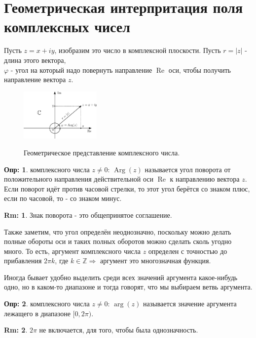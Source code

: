\documentclass[12pt]{article}
\newcommand{\RN}[1]{%
	\textup{\uppercase\expandafter{\romannumeral#1}}%
}
\newcommand{\MZ}{\mathbb{Z}}
\theoremstyle{definition}
\newtheorem{defn}{Опр:}
\newtheorem{rem}{Rm:}
\DeclareMathOperator{\RE}{\operatorname{Re}}
\DeclareMathOperator\Arg{Arg}
\begin{document}
\lhead{Алгебра-\RN{1}}

\section*{Геометрическая интерпритация поля комплексных чисел}
Пусть $z = x + iy$, изобразим это число в комплексной плоскости. Пусть $r =|z|$ - длина этого вектора, \\ $\varphi$ - угол на который надо повернуть направление $\RE$ оси, чтобы получить направление вектора $z$.
\begin{figure}[H]
	\centering
	\includegraphics[width=0.35\textwidth]{AL1L14_1.eps}
	\label{AL1L14_1}
	\caption{Геометрическое представление комплексного числа.}
\end{figure}
\begin{defn}
	 комплексного числа $z \neq 0$: $\Arg{(z)}$ называется угол поворота от положительного направления действительной оси $\RE$ к направлению вектора $z$. Если поворот идёт против часовой стрелки, то этот угол берётся со знаком плюс, если по часовой, то - со знаком минус.
\end{defn}
\begin{rem}
	Знак поворота - это общепринятое соглашение.
\end{rem}

Также заметим, что угол определён неоднозначно, поскольку можно делать полные обороты оси и таких полных оборотов можно сделать сколь угодно много. То есть, аргумент комплексного числа $z$ определен с точностью до прибавления $2\pi k$, где $k \in \MZ \Rightarrow$ аргумент это многозначная функция. 

Иногда бывает удобно выделить среди всех значений аргумента какое-нибудь одно, но в каком-то диапазоне и тогда говорят, что мы выбираем ветвь аргумента.

\begin{defn}
	 комплексного числа $z \neq 0$: $\arg{(z)}$ называется значение аргумента лежащего в диапазоне $[0,2\pi)$.
\end{defn}
\begin{rem}
	$2\pi$ не включается, для того, чтобы была однозначность.
\end{rem}
\end{document}
